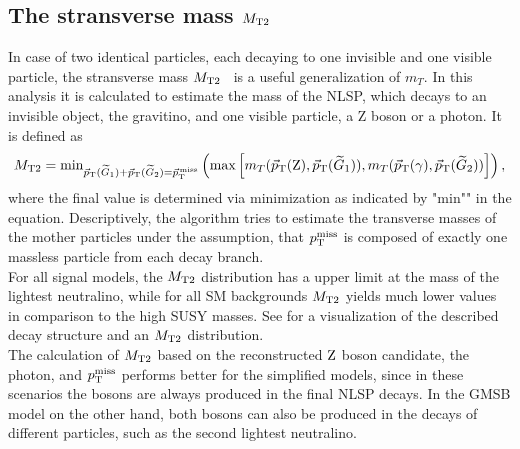 \subsection*{The stransverse mass $M_{\mathrm{T2}}$}
In case of two identical particles, each decaying to one invisible and one visible particle, the stransverse mass $M_{\mathrm{T2}}$~\cite{Mt2_1,Mt2_2} is a useful generalization of $m_T$. In this analysis it is calculated to estimate the mass of the NLSP, which decays to an invisible object, the gravitino, and one visible particle, a Z boson or a photon. It is defined as
\begin{equation}
 M_{\mathrm{T2}} = \text{min}_{{\vec p}_{\mathrm{T}}(\widetilde{G}_1)+{\vec p}_{\mathrm{T}}(\widetilde{G}_2)={\vec p}_{\mathrm{T}}^{\kern1pt\text{miss}}}\left(\text{max}\left[m_T({\vec p}_{\mathrm{T}}(\mathrm{Z}),{\vec p}_{\mathrm{T}}(\widetilde{G}_1)),m_T({\vec p}_{\mathrm{T}}(\gamma),{\vec p}_{\mathrm{T}}(\widetilde{G}_2))\right]\right),
\end{equation}
where the final value is determined via minimization as indicated by "$\text{min}$"" in the equation. Descriptively, the algorithm tries to estimate the transverse masses of the mother particles under the assumption, that $p_{\mathrm{T}}^\text{miss}$ is composed of exactly one massless particle from each decay branch.\\
For all signal models, the $M_{\mathrm{T2}}$ distribution has a upper limit at the mass of the lightest neutralino, while for all SM backgrounds $M_{\mathrm{T2}}$ yields much lower values in comparison to the high SUSY masses. See  for a visualization of the described decay structure and an $M_{\mathrm{T2}}$ distribution.\\
The calculation of $M_{\mathrm{T2}}$ based on the reconstructed $\mathrm{Z}$ boson candidate, the photon, and $p_{\mathrm{T}}^\text{miss}$ performs better for the simplified models, since in these scenarios the bosons are always produced in the final NLSP decays. In the GMSB model on the other hand, both bosons can also be produced in the decays of different particles, such as the second lightest neutralino.

